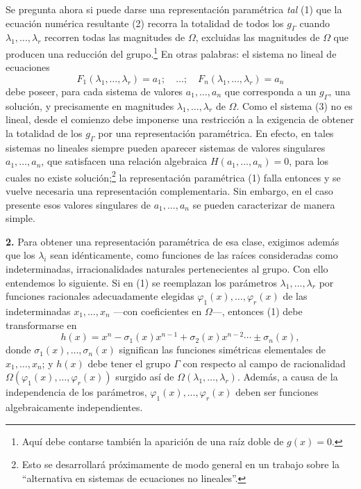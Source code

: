 Se pregunta ahora si puede darse una representación paramétrica \emph{tal} (1) que la ecuación numérica resultante (2) recorra la totalidad de todos los $g_\Gamma$ cuando $\lambda_1,
\ldots,\lambda_r$ recorren todas las magnitudes de $\Omega$, excluidas las magnitudes de $\Omega$ que producen una reducción del grupo.\footnote{Aquí debe contarse también la aparición de una raíz doble de $g(x)=0$.} En otras palabras: el sistema no lineal de ecuaciones
\begin{equation}\tag{3}
F_1(\lambda_1,
\ldots,\lambda_r)=a_1;\quad \ldots;\quad F_n(\lambda_1,\ldots,\lambda_r)=a_n
\end{equation}
debe poseer, para cada sistema de valores $a_1,
\ldots,a_n$ que corresponda a un $g_\Gamma$, una solución, y precisamente en magnitudes $\lambda_1,
\ldots,\lambda_r$ de $\Omega$. Como el sistema (3) no es lineal, desde el comienzo debe imponerse una restricción a la exigencia de obtener la totalidad de los $g_\Gamma$ por una representación paramétrica. En efecto, en tales sistemas no lineales siempre pueden aparecer sistemas de valores singulares $a_1,
\ldots,a_n$, que satisfacen una relación algebraica $H(a_1,
\ldots,a_n)=0$, para los cuales no existe solución;\footnote{Esto se desarrollará próximamente de modo general en un trabajo sobre la ``alternativa en sistemas de ecuaciones no lineales''.} la representación paramétrica (1) falla entonces y se vuelve necesaria una representación complementaria. Sin embargo, en el caso presente esos valores singulares de $a_1,
\ldots,a_n$ se pueden caracterizar de manera simple.

\textbf{2.} Para obtener una representación paramétrica de esa clase, exigimos además que los $\lambda_i$ sean idénticamente, como funciones de las raíces consideradas como indeterminadas, irracionalidades naturales pertenecientes al grupo. Con ello entendemos lo siguiente. Si en (1) se reemplazan los parámetros $\lambda_1,
\ldots,\lambda_r$ por funciones racionales adecuadamente elegidas $\varphi_1(x),\ldots,\varphi_r(x)$ de las indeterminadas $x_1,
\ldots,x_n$ ---con coeficientes en $\Omega$---, entonces (1) debe transformarse en
\begin{equation}\tag{4}
h(x)=x^n-\sigma_1(x)x^{n-1}+\sigma_2(x)x^{n-2}\cdots \pm \sigma_n(x),
\end{equation}
donde $\sigma_1(x),\ldots,\sigma_n(x)$ significan las funciones simétricas elementales de $x_1,
\ldots,x_n$; y $h(x)$ debe tener el grupo $\Gamma$ con respecto al campo de racionalidad $\Omega(\varphi_1(x),\ldots,\varphi_r(x))$ surgido así de $\Omega(\lambda_1,
\ldots,\lambda_r)$. Además, a causa de la independencia de los parámetros, $\varphi_1(x),\ldots,\varphi_r(x)$ deben ser funciones algebraicamente independientes.

